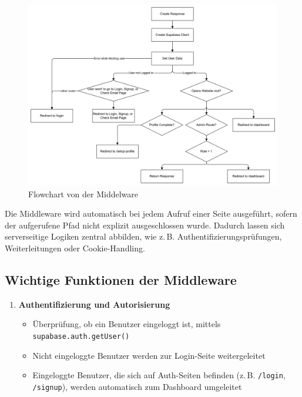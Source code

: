 \begin{inhalt}
\vspace{2cm}

\begin{figure}[!htb]
\centering
\includegraphics[width=1\textwidth]{files/Thomas/pics/Website/middelware/middelware.png}
\caption[Bildbezeichnung für Abbildungsverzeichnis]{Flowchart von der Middelware}
\label{fig:middleware}
\end{figure}

\newpage

Die Middleware wird automatisch bei jedem Aufruf einer Seite ausgeführt, sofern der aufgerufene Pfad nicht explizit ausgeschlossen wurde.  
Dadurch lassen sich serverseitige Logiken zentral abbilden, wie z.\,B. Authentifizierungsprüfungen, Weiterleitungen oder Cookie-Handling.

\subsection*{Wichtige Funktionen der Middleware}

\begin{enumerate}[label=\textbf{\arabic*.}]
  \item \textbf{Authentifizierung und Autorisierung}
  \begin{itemize}
    \item Überprüfung, ob ein Benutzer eingeloggt ist, mittels \texttt{supabase.auth.getUser()}
    \item Nicht eingeloggte Benutzer werden zur Login-Seite weitergeleitet
    \item Eingeloggte Benutzer, die sich auf Auth-Seiten befinden (z.\,B. \texttt{/login}, \texttt{/signup}), werden automatisch zum Dashboard umgeleitet
  \end{itemize}


\end{enumerate}
\end{inhalt}
